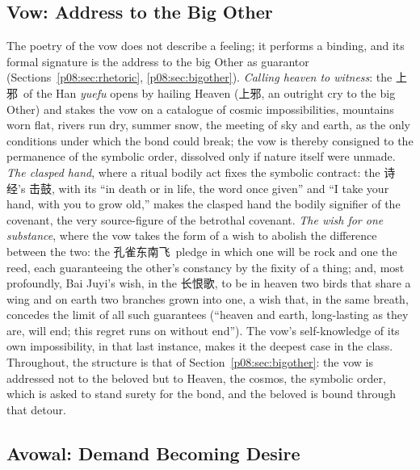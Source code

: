\subsection{Vow: Address to the Big Other}\label{p08:sec:case-vow}

The poetry of the vow does not describe a feeling; it performs a binding, and its formal signature is the address to the big Other as guarantor (Sections~\ref{p08:sec:rhetoric}, \ref{p08:sec:bigother}). \emph{Calling heaven to witness}: the \cjkfont 上邪\normalfont\ of the Han \emph{yuefu} opens by hailing Heaven (\cjkfont 上邪\normalfont, an outright cry to the big Other) and stakes the vow on a catalogue of cosmic impossibilities, mountains worn flat, rivers run dry, summer snow, the meeting of sky and earth, as the only conditions under which the bond could break; the vow is thereby consigned to the permanence of the symbolic order, dissolved only if nature itself were unmade. \emph{The clasped hand}, where a ritual bodily act fixes the symbolic contract: the \cjkfont 诗经\normalfont's \cjkfont 击鼓\normalfont, with its ``in death or in life, the word once given'' and ``I take your hand, with you to grow old,'' makes the clasped hand the bodily signifier of the covenant, the very source-figure of the betrothal covenant. \emph{The wish for one substance}, where the vow takes the form of a wish to abolish the difference between the two: the \cjkfont 孔雀东南飞\normalfont\ pledge in which one will be rock and one the reed, each guaranteeing the other's constancy by the fixity of a thing; and, most profoundly, Bai Juyi's wish, in the \cjkfont 长恨歌\normalfont, to be in heaven two birds that share a wing and on earth two branches grown into one, a wish that, in the same breath, concedes the limit of all such guarantees (``heaven and earth, long-lasting as they are, will end; this regret runs on without end''). The vow's self-knowledge of its own impossibility, in that last instance, makes it the deepest case in the class. Throughout, the structure is that of Section~\ref{p08:sec:bigother}: the vow is addressed not to the beloved but to Heaven, the cosmos, the symbolic order, which is asked to stand surety for the bond, and the beloved is bound through that detour.

\subsection{Avowal: Demand Becoming Desire}\label{p08:sec:case-avowal}

